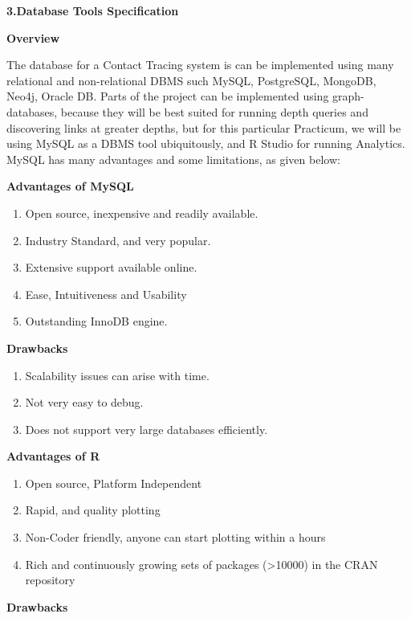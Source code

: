 \documentclass[
]{article}
\begin{document}
\textbf{3.Database Tools Specification}

\textbf{Overview}

The database for a Contact Tracing system is can be implemented using
many relational and non-relational DBMS such MySQL, PostgreSQL, MongoDB,
Neo4j, Oracle DB. Parts of the project can be implemented using
graph-databases, because they will be best suited for running depth
queries and discovering links at greater depths, but for this particular
Practicum, we will be using MySQL as a DBMS tool ubiquitously, and R
Studio for running Analytics. MySQL has many advantages and some
limitations, as given below:

\textbf{Advantages of MySQL}

\begin{enumerate}
\def\labelenumi{\arabic{enumi}.}
\item
  Open source, inexpensive and readily available.
\item
  Industry Standard, and very popular.
\item
  Extensive support available online.
\item
  Ease, Intuitiveness and Usability
\item
  Outstanding InnoDB engine. 
\end{enumerate}

\textbf{Drawbacks}

\begin{enumerate}
\def\labelenumi{\arabic{enumi}.}
\item
  Scalability issues can arise with time.
\item
  Not very easy to debug.
\item
  Does not support very large databases efficiently.
\end{enumerate}

\textbf{Advantages of R}

\begin{enumerate}
\def\labelenumi{\arabic{enumi}.}
\item
  Open source, Platform Independent
\item
  Rapid, and quality plotting
\item
  Non-Coder friendly, anyone can start plotting within a hours
\item
  Rich and continuously growing sets of packages (\textgreater10000) in
  the CRAN repository 
\end{enumerate}

\textbf{Drawbacks}
\end{document}
